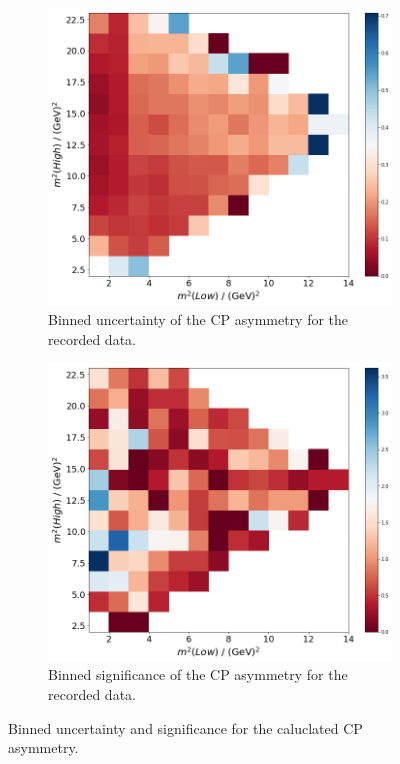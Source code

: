 \begin{figure}
  \centering
  \begin{subfigure}[b]{0.45\textwidth}
      \centering
      \includegraphics[width=\textwidth]{"content/pics/binned_unc_no_charm.png"}
      \caption{Binned uncertainty of the CP asymmetry for the recorded data.}
  \end{subfigure}
  \hfill
  \begin{subfigure}[b]{0.45\textwidth}
      \centering
      \includegraphics[width=\textwidth]{"content/pics/binned_sig_no_charm.png"}
      \caption{Binned significance of the CP asymmetry for the recorded data.}
  \end{subfigure}
     \caption{Binned uncertainty and significance for the caluclated CP asymmetry.}
     \label{fig:binned_unc_sig_no_charm}
\end{figure}
